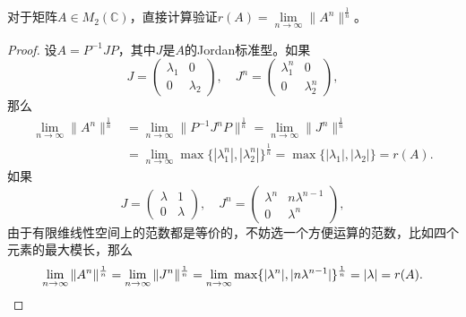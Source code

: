 \begin{14}
    对于矩阵$A \in M_2(\mathbb{C})$，直接计算验证$r(A)=\lim\limits_{n\to\infty}\|A^n\|^\frac{1}{n}$。
\end{14}
\begin{proof}
    设$A=P^{-1}JP$，其中$J$是$A$的Jordan标准型。如果
    \[J=\begin{pmatrix}\lambda_1&0\\0&\lambda_2\end{pmatrix},\quad
    J^n=\begin{pmatrix}\lambda_1^n&0\\0&\lambda_2^n\end{pmatrix},\]
    那么
    \begin{align*}
        \lim_{n\to\infty}\|A^n\|^\frac{1}{n}
        &=\lim_{n\to\infty}\|P^{-1}J^nP\|^\frac{1}{n}
        =\lim_{n\to\infty}\|J^n\|^\frac{1}{n}\\
        &=\lim_{n\to\infty}\max\{|\lambda_1^n|,|\lambda_2^n|\}^\frac{1}{n}
        =\max\{|\lambda_1|,|\lambda_2|\}=r(A).
    \end{align*}
    如果
    \[J=\begin{pmatrix}\lambda&1\\0&\lambda\end{pmatrix},\quad
    J^n=\begin{pmatrix}\lambda^n&n\lambda^{n-1}\\0&\lambda^n\end{pmatrix},\]
    由于有限维线性空间上的范数都是等价的，不妨选一个方便运算的范数，比如四个元素的最大模长，那么
    \[\lim_{n\to\infty}\|A^n\|^\frac{1}{n}=\lim_{n\to\infty}\|J^n\|^\frac{1}{n}
    =\lim_{n\to\infty}\max\{|\lambda^n|,|n\lambda^{n-1}|\}^\frac{1}{n}=|\lambda|=r(A).\qedhere\]
\end{proof}

